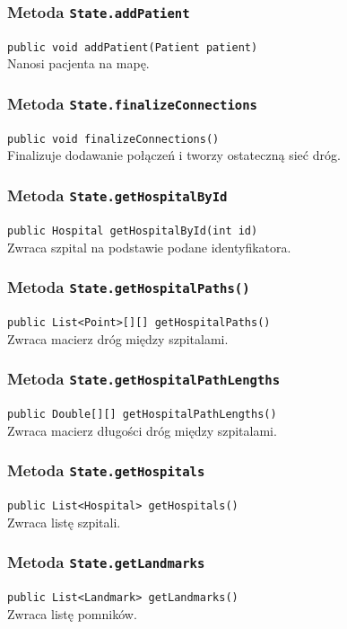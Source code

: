 \documentclass{article}
\begin{document}
\subsubsection{Metoda \texttt{State.addPatient}}
\texttt{public void addPatient(Patient patient)} \\
Nanosi pacjenta na mapę.

\subsubsection{Metoda \texttt{State.finalizeConnections}}
\texttt{public void finalizeConnections()} \\
Finalizuje dodawanie połączeń i tworzy ostateczną sieć dróg.

\subsubsection{Metoda \texttt{State.getHospitalById}}
\texttt{public Hospital getHospitalById(int id)} \\
Zwraca szpital na podstawie podane identyfikatora.

\subsubsection{Metoda \texttt{State.getHospitalPaths()}}
\texttt{public List<Point>[][] getHospitalPaths()} \\
Zwraca macierz dróg między szpitalami.

\subsubsection{Metoda \texttt{State.getHospitalPathLengths}}
\texttt{public Double[][] getHospitalPathLengths()} \\
Zwraca macierz długości dróg między szpitalami.

\subsubsection{Metoda \texttt{State.getHospitals}}
\texttt{public List<Hospital> getHospitals()} \\
Zwraca listę szpitali.

\subsubsection{Metoda \texttt{State.getLandmarks}}
\texttt{public List<Landmark> getLandmarks()} \\
Zwraca listę pomników.
\end{document}
